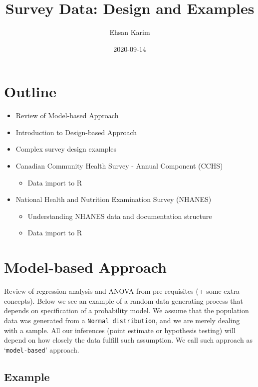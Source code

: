 \documentclass[
]{book}
\title{Survey Data: Design and Examples}
\author{Ehsan Karim}
\date{2020-09-14}
\providecommand{\tightlist}{%
  \setlength{\itemsep}{0pt}\setlength{\parskip}{0pt}}
\begin{document}
\maketitle

{
\setcounter{tocdepth}{1}
\tableofcontents
}
\hypertarget{outline}{%
\chapter{Outline}\label{outline}}

\begin{itemize}
\tightlist
\item
  Review of Model-based Approach
\item
  Introduction to Design-based Approach
\item
  Complex survey design examples
\item
  Canadian Community Health Survey - Annual Component (CCHS)

  \begin{itemize}
  \tightlist
  \item
    Data import to R
  \end{itemize}
\item
  National Health and Nutrition Examination Survey (NHANES)

  \begin{itemize}
  \tightlist
  \item
    Understanding NHANES data and documentation structure
  \item
    Data import to R
  \end{itemize}
\end{itemize}

\hypertarget{tab-3}{%
\chapter{Model-based Approach}\label{tab-3}}

Review of regression analysis and ANOVA from pre-requisites (+ some extra concepts). Below we see an example of a random data generating process that depends on specification of a probability model. We assume that the population data was generated from a \texttt{Normal\ distribution}, and we are merely dealing with a sample. All our inferences (point estimate or hypothesis testing) will depend on how closely the data fulfill such assumption. We call such approach as `\texttt{model-based}' approach.

\hypertarget{example}{%
\section{Example}\label{example}}
\end{document}
